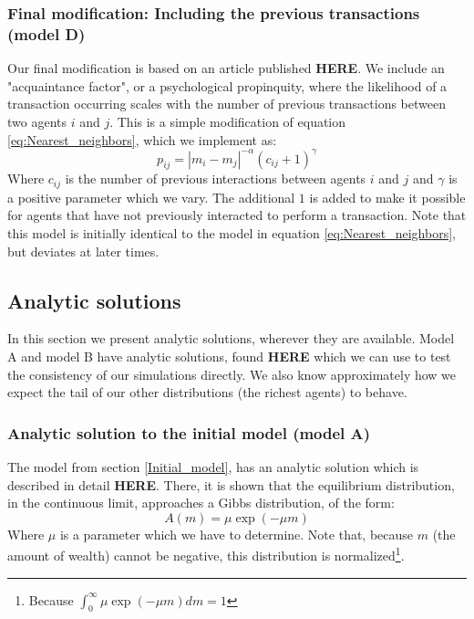 \documentclass[a4paper, 10pt]{article}
\begin{document}
\subsubsection{Final modification: Including the previous transactions (model D)}\label{Model_D}
Our final modification is based on an article published \textbf{HERE}. We include an "acquaintance factor", or a psychological propinquity, where the likelihood of a transaction occurring scales with the number of previous transactions between two agents $i$ and $j$. This is a simple modification of equation \ref{eq:Nearest_neighbors}, which we implement as:
\begin{equation}\label{eq:nearest_with_previous_transactions}
p_{ij}=|m_i-m_j|^{-\alpha}(c_{ij}+1)^{\gamma}
\end{equation} 
Where $c_{ij}$ is the number of previous interactions between agents $i$ and $j$ and $\gamma$ is a positive parameter which we vary. The additional $1$ is added to make it possible for agents that have not previously interacted to perform a transaction. Note that this model is initially identical to the model in equation \ref{eq:Nearest_neighbors}, but deviates at later times.
\subsection{Analytic solutions}\label{Analytic_solution}
In this section we present analytic solutions, wherever they are available. Model A and model B have analytic solutions, found \textbf{HERE} which we can use to test the consistency of our simulations directly. We also know approximately how we expect the tail of our other distributions (the richest agents) to behave.
\subsubsection{Analytic solution to the initial model (model A)}
The model from section \ref{Initial_model}, has an analytic solution which is described in detail \textbf{HERE}. There, it is shown that the equilibrium distribution, in the continuous limit, approaches a Gibbs distribution, of the form:
\begin{equation}\label{eq:Analytic_solution_A}
A(m)=\mu \exp(-\mu m)
\end{equation}
Where $\mu$ is a parameter which we have to determine. Note that, because $m$ (the amount of wealth) cannot be negative, this distribution is normalized\footnote{Because $\int_0^{\infty} \mu \exp(-\mu m)dm=1$}.
\end{document}
